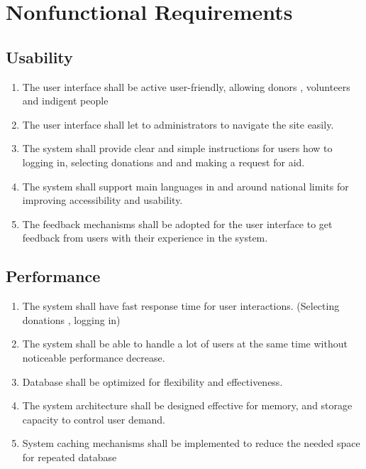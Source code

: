 \documentclass[a4paper,12pt]{report}
\begin{document}
	\chapter{Nonfunctional Requirements}
	\section{Usability}
	\begin{enumerate}
		\item The user interface shall be active   user-friendly, allowing donors , volunteers and indigent people
		
		\item The user interface shall let to administrators to navigate the site easily.
		
		\item The system shall provide clear and simple  instructions for users how to logging in, selecting donations and and making a request for aid. 
		
		\item The system shall support main languages in and around national limits for improving accessibility and usability.
		
		\item The feedback mechanisms shall be adopted for the user interface to get feedback from users with their experience in the system.
	\end{enumerate}
	\section{Performance}
	\begin{enumerate}
		\item The system shall have fast response time  for user interactions. (Selecting donations , logging in)
		
		\item The system shall be able to handle a lot of users at the same time without noticeable performance decrease.
		
		\item Database shall be optimized for flexibility and effectiveness.
		
		\item The system architecture shall be designed effective for  memory, and storage capacity to control user demand.
		
		\item System caching mechanisms shall be implemented to reduce the needed space for repeated database 
	\end{enumerate}
\end{document}
